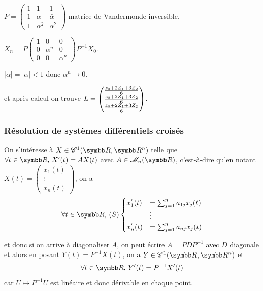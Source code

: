 \begin{exemple}
    $P = \begin{pmatrix}
        1 & 1 & 1 \\
        1 & \alpha & \bar \alpha \\
        1 & \alpha^2 & \bar \alpha^2
    \end{pmatrix}
    $ matrice de Vandermonde inversible.

    $X_n = P \begin{pmatrix}
        1 & 0 & 0 \\
        0 & \alpha^n & 0 \\
        0 & 0 & \bar \alpha^n
    \end{pmatrix} P^{-1} X_0$.

    $|\alpha| = |\bar \alpha| < 1$ donc $\alpha^n \to 0$.

    et après calcul on trouve $\displaystyle L = \begin{pmatrix}
        \frac{z_0 + 2 Z_1 + 3 Z_2}{6} \\
        \frac{z_0 + 2 Z_1 + 3 Z_2}{6} \\
        \frac{z_0 + 2 Z_1 + 3 Z_2}{6}
    \end{pmatrix}$.
\end{exemple}

\subsubsection{Résolution de systèmes différentiels croisés }

On s'intéresse à $X \in \mathscr C^1(\R, \R^n)$ telle que $\forall t \in \R, \, X'(t) = A X(t)$ 
avec $A \in \mathscr M_n(\R)$, c'est-à-dire qu'en notant $X(t) = \begin{pmatrix}
x_1(t) \\
\vdots \\
x_n(t)
\end{pmatrix}$, on a $$\forall t \in \R, \,(S) \begin{cases}
\ds x_1'(t) & = \sum_{j = 1 }^{n } a_{1j} x_j(t) \\
& \vdots \\
\ds x_n'(t) & = \sum_{j = 1 }^{ n } a_{nj} x_j(t)
\end{cases}$$

et donc si on arrive à diagonaliser $A$, on peut écrire $A = PDP^{-1}$ avec $D$ diagonale
et alors en posant $Y(t) = P^{-1} X(t)$, on a $Y \in \mathscr C^1(\R, \R^n)$ et
$$\forall t \in \R, \, Y'(t) = P^{-1} X'(t) $$ car $U \mapsto P^{-1} U$ est linéaire et donc dérivable en chaque point.

